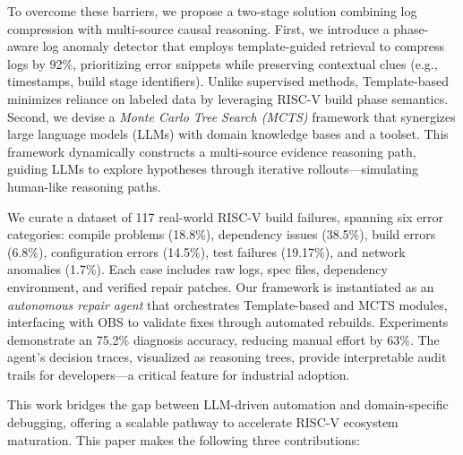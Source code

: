 \documentclass[10pt,conference]{IEEEtran}
\begin{document}
To overcome these barriers, we propose a two-stage solution combining log compression with multi-source causal reasoning. First, we introduce a phase-aware log anomaly detector that employs template-guided retrieval to compress logs by 92\%, prioritizing error snippets while preserving contextual clues (e.g., timestamps, build stage identifiers). Unlike supervised methods, Template-based minimizes reliance on labeled data by leveraging RISC-V build phase semantics. Second, we devise a \textit{Monte Carlo Tree Search (MCTS)} framework that synergizes large language models (LLMs) with domain knowledge bases and a toolset. This framework dynamically constructs a multi-source evidence reasoning path, guiding LLMs to explore hypotheses through iterative rollouts---simulating human-like reasoning paths. 

We curate a dataset of 117 real-world RISC-V build failures, spanning six error categories: compile problems (18.8\%), dependency issues (38.5\%), build errors (6.8\%), configuration errors (14.5\%), test failures (19.17\%), and network anomalies (1.7\%). Each case includes raw logs, spec files, dependency environment, and verified repair patches. Our framework is instantiated as an \textit{autonomous repair agent} that orchestrates Template-based and MCTS modules, interfacing with OBS to validate fixes through automated rebuilds. Experiments demonstrate an 75.2\% diagnosis accuracy, reducing manual effort by 63\%. The agent's decision traces, visualized as reasoning trees, provide interpretable audit trails for developers---a critical feature for industrial adoption.

This work bridges the gap between LLM-driven automation and domain-specific debugging, offering a scalable pathway to accelerate RISC-V ecosystem maturation. 
This paper makes the following three contributions:

\end{document}
